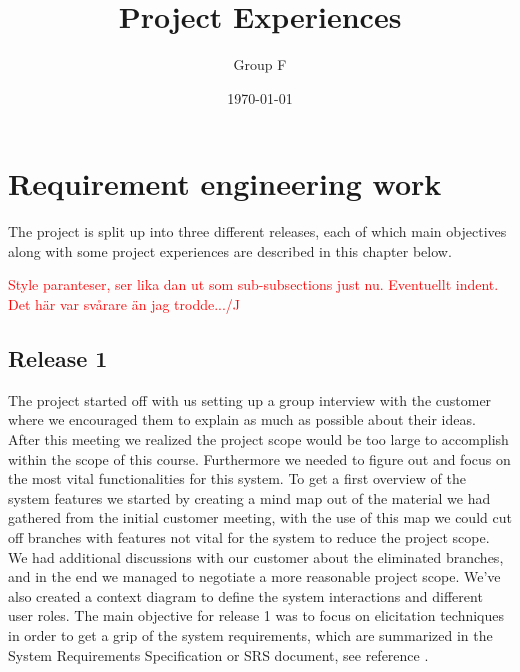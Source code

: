\documentclass[10pt]{article}
\newcommand\todo[1]{\textcolor{red}{#1}}
\begin{document}
\makeatletter
\renewcommand{\@biblabel}[1]{\quad#1.}
\makeatother


\pagestyle{myheadings}





\begin{titlepage}
\title{Project Experiences}
\author{Group F}
\date{\today}
\maketitle
\thispagestyle{empty}
\end{titlepage}

\tableofcontents
\thispagestyle{empty}
\newpage
{}

\section{Requirement engineering work}
\noindent The project is split up into three different releases, each of which main objectives along with some project experiences are described in this chapter below.

\todo{Style paranteser, ser lika dan ut som sub-subsections just nu. Eventuellt indent. Det här var svårare än jag trodde.../J}

\subsection{Release 1}
The project started off with us setting up a group interview with the customer where we encouraged them to explain as much as possible about their ideas. After this meeting we realized the project scope would be too large to accomplish within the scope of this course. Furthermore we needed to figure out and focus on the most vital functionalities for this system.
To get a first overview of the system features we started by creating a mind map out of the material we had gathered from the initial customer meeting, with the use of this map we could cut off branches with features not vital for the system to reduce the project scope.
We had additional discussions with our customer about the eliminated branches, and in the end we managed to negotiate a more reasonable project scope.
\newline We've also created a context diagram to define the system interactions and different user roles.
The main objective for release 1 was to focus on elicitation techniques in order to get a grip of the system requirements, which are summarized in the System Requirements Specification or SRS document, see reference \cite{srs}.
\end{document}

